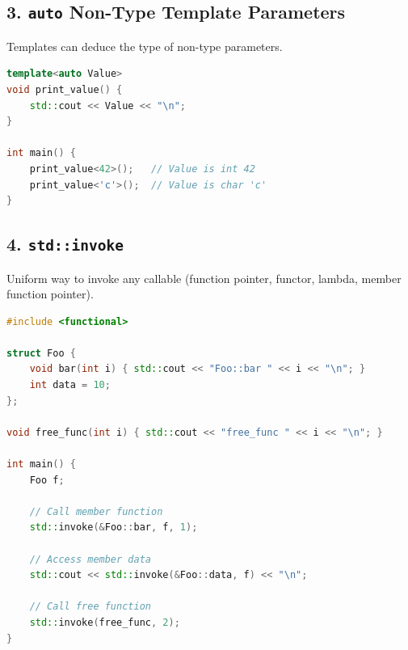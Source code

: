 \hypertarget{auto-non-type-template-parameters}{%
\subsection{\texorpdfstring{3. \texttt{auto} Non-Type Template
Parameters}{3. auto Non-Type Template Parameters}}\label{auto-non-type-template-parameters}}

Templates can deduce the type of non-type parameters.

\begin{lstlisting}[language={C++}]
template<auto Value>
void print_value() {
    std::cout << Value << "\n";
}

int main() {
    print_value<42>();   // Value is int 42
    print_value<'c'>();  // Value is char 'c'
}
\end{lstlisting}

\hypertarget{stdinvoke}{%
\subsection{\texorpdfstring{4.
\texttt{std::invoke}}{4. std::invoke}}\label{stdinvoke}}

Uniform way to invoke any callable (function pointer, functor, lambda,
member function pointer).

\begin{lstlisting}[language={C++}]
#include <functional>

struct Foo {
    void bar(int i) { std::cout << "Foo::bar " << i << "\n"; }
    int data = 10;
};

void free_func(int i) { std::cout << "free_func " << i << "\n"; }

int main() {
    Foo f;

    // Call member function
    std::invoke(&Foo::bar, f, 1);

    // Access member data
    std::cout << std::invoke(&Foo::data, f) << "\n";

    // Call free function
    std::invoke(free_func, 2);
}
\end{lstlisting}
